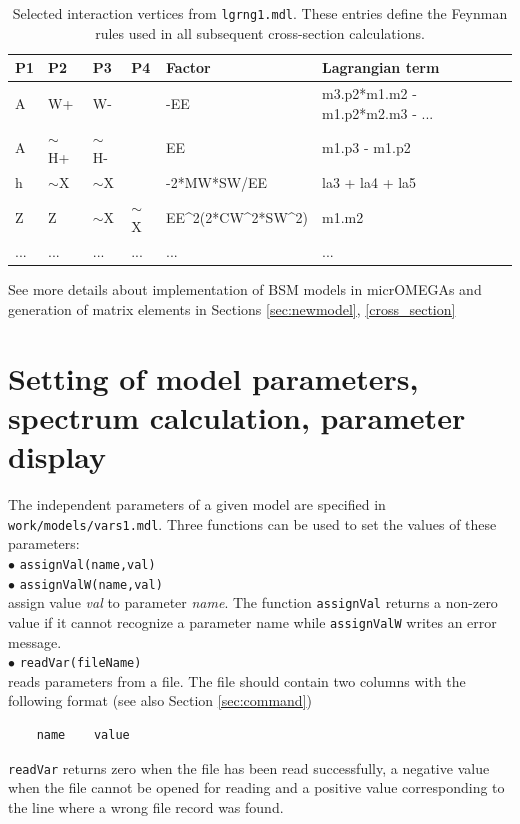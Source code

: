\documentclass[12pt,a4paper]{article}
\def\pw{\textasciicircum}
\begin{document}
\begin{table}[htbp]
\centering
{\small
\begin{tabular}{l|l|l|l|l|l}
P1 & P2 & P3 & P4 & Factor & Lagrangian term \\
\hline
A & W+ & W- &   & -EE & m3.p2*m1.m2 - m1.p2*m2.m3 - ... \\
A & $\sim$H+ & $\sim$H- &   & EE  & m1.p3 - m1.p2 \\
h & $\sim$X & $\sim$X &   & -2*MW*SW/EE & la3 + la4 + la5 \\
Z & Z & $\sim$X & $\sim$X & EE\pw2(2*CW\pw2*SW\pw2) & m1.m2 \\
... & ... & ... & ... & ... & ...
\end{tabular}
}
\caption{Selected interaction vertices from \texttt{lgrng1.mdl}.  
These entries define the Feynman rules used in all subsequent cross-section calculations.}
\label{tab:FeynRules}
\end{table}

See more details about implementation of BSM models in micrOMEGAs and generation of matrix elements in Sections \ref{sec:newmodel}, \ref{cross_section}



\section{Setting of model parameters, spectrum calculation, parameter display}
\label{setting_parameters}
The independent parameters %
of a given model are specified in 
\noindent
\verb|work/models/vars1.mdl|. Three functions can be used to set the
values of these parameters:\\[2mm]
$\bullet$ \verb|assignVal(name,val)|\\[2mm]
$\bullet$ \verb|assignValW(name,val)|\\[2mm]
assign value {\it val} to parameter {\it name}. The function  \verb|assignVal| returns a non-zero
value  if it
cannot recognize  a parameter name while \verb|assignValW| writes an error message.\\[2mm]
$\bullet$ \verb|readVar(fileName)|\\
reads parameters from a file. The file  should contain two columns with the 
 following  format (see also Section \ref{sec:command})
\begin{verbatim}
    name    value
\end{verbatim}
\verb|readVar| returns zero when
the file has been read successfully, a negative value when the
file cannot be opened for reading and  a positive  value 
corresponding to the line where a wrong file record was found.
\end{document}
